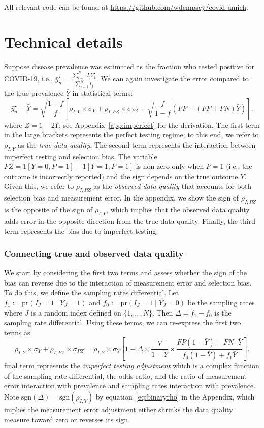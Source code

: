 \documentclass[11pt]{amsart}
\def\pr{\text{pr}}
\def\sgn{\text{sgn}}
\begin{document}



\appendix

All relevant code can be found at \url{https://github.com/wdempsey/covid-umich}.

\section{Technical details}

Suppose disease prevalence was estimated as the fraction who tested positive for COVID-19, i.e., $\bar y_n^\star = \frac{\sum_{i=1}^N I_j Y_j^\star}{\sum_{i=1}^N I_j}$.  We can again investigate the error compared to the true prevalence $\bar Y$ in statistical terms:
$$
\bar y_n^\star - \bar Y = \sqrt{\frac{1-f}{f}} \left[ \rho_{I,Y} \times \sigma_Y + \rho_{I,PZ} \times \sigma_{PZ} + \sqrt{\frac{f}{1-f}}  \left( FP - (FP+FN) \bar Y \right) \right] .
$$
where $Z = 1-2Y$; see Appendix~\ref{app:imperfect} for the derivation. The first term in the large brackets represents the perfect testing regime; to this end, we refer to $\rho_{I,Y}$ as the \emph{true data quality}.  The second term represents the interaction between imperfect testing and selection bias. The variable $PZ = 1[Y=0,P=1] - 1[Y=1, P=1]$ is non-zero only when $P=1$ (i.e., the outcome is incorrectly reported) and the sign depends on the true outcome $Y$.  Given this, we refer to $\rho_{I,PZ}$ as the \emph{observed data quality} that accounts for both selection bias and measurement error.  In the appendix, we show the sign of $\rho_{I,PZ}$ is the opposite of the sign of $\rho_{I,Y}$, which implies that the observed data quality adds error in the opposite direction from the true data quality.  Finally, the third term represents the bias due to imperfect testing.

\subsubsection{Connecting true and observed data quality}

We start by considering the first two terms and assess whether the sign of the bias can reverse due to the interaction of measurement error and selection bias.  To do this, we define the sampling rates differential.  Let $f_1 := \pr (I_J = 1 \mid Y_J = 1)$ and $f_0 := \pr(I_J = 1 \mid Y_J = 0)$ be the sampling rates where $J$ is a random index defined on $\{1,\ldots, N\}$.  Then $\Delta = f_1 - f_0$ is the sampling rate differential.  Using these terms, we can re-express the first two terms as
$$
\rho_{I,Y} \times \sigma_Y + \rho_{I,PZ} \times \sigma_{PZ} =
\rho_{I,Y} \times \sigma_Y \left[ 1 - \Delta \times \frac{\bar Y}{1-\bar Y} \times \frac{FP(1-\bar Y) + FN \cdot \bar Y}{f_0 (1-\bar Y) + f_1 \bar Y} \right].
$$
final term represents the \emph{imperfect testing adjustment} which is a complex function of the sampling rate differential, the odds ratio, and the ratio of measurement error interaction with prevalence and sampling rates interaction with prevalence. Note $\sgn(\Delta) = \sgn(\rho_{I,Y})$ by equation~\ref{eq:binaryrho} in the Appendix, which implies the measurement error adjustment either shrinks the data quality measure toward zero or reverses its sign.
\end{document}
